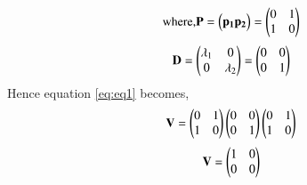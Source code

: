 \documentclass[journal,12pt,twocolumn]{IEEEtran}
\begin{document}
		\begin{align}
			\mbox{where,} \mathbf{P} = \begin{pmatrix}\mathbf{p_1} \mathbf{p_2}\end{pmatrix} = \begin{pmatrix}0&1\\1&0\end{pmatrix}
		\end{align}
		\begin{align}
			\mathbf{D} = \begin{pmatrix}\lambda_1&0\\0&\lambda_2\end{pmatrix} = \begin{pmatrix}0&0\\0&1\end{pmatrix}
		\end{align}
		Hence equation \eqref{eq:eq1} becomes,
		\begin{align}
			\mathbf{V} = \begin{pmatrix}0&1\\1&0\end{pmatrix}\begin{pmatrix}0&0\\0&1\end{pmatrix}\begin{pmatrix}0&1\\1&0\end{pmatrix}
		\end{align}
		\begin{align}
			\mathbf{V} = \begin{pmatrix}1&0\\0&0\end{pmatrix}
		\end{align}
	
\end{document}
